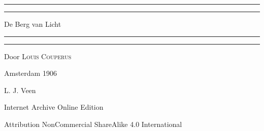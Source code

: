 \documentclass[a4paper, 12pt, oneside, dutch]{article}
\begin{document}
\begin{titlepage} %
	\centering %
	\scshape %

	
	\rule{\textwidth}{1.6pt}\vspace*{-\baselineskip}\vspace*{2pt} %
	\rule{\textwidth}{0.4pt} %
	
	\vspace{0.75\baselineskip} %

        {\LARGE De Berg van Licht \\} %
	
	\vspace{0.75\baselineskip} %
	
	\rule{\textwidth}{0.4pt}\vspace*{-\baselineskip}\vspace{3.2pt} %
	\rule{\textwidth}{1.6pt} %
	
	\vspace{1\baselineskip} %
	
	
	{Door \scshape\Large Louis Couperus \\} %
	
	\vspace*{1\baselineskip} %
	


	\vspace{1\baselineskip} %

	
	
		
	\vspace*{\fill}%
	
	Amsterdam 1906 %
	
	{\small L. J. Veen } %

	\vspace{1\baselineskip} %

        Internet Archive Online Edition  %
	
	{\small Attribution NonCommercial ShareAlike 4.0 International } %
\end{titlepage}
\end{document}
